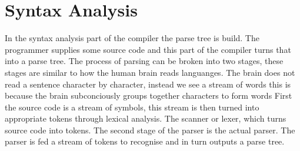 \section{Syntax Analysis}
In the syntax analysis part of the compiler the parse tree is build.
The programmer supplies some source code and this part of the compiler turns that into a parse tree.
The process of parsing can be broken into two stages, these stages are similar to how the human brain reads languanges.
The brain does not read a sentence character by character, instead we see a stream of words this is because the brain subconciously groups together characters to form words
First the source code is a stream of symbols, this stream is then turned into appropriate tokens through lexical analysis.
The scanner or lexer, which turns source code into tokens.
The second stage of the parser is the actual parser.
The parser is fed a stream of tokens to recognise and in turn outputs a parse tree.

